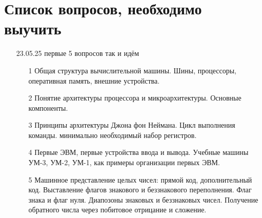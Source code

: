 \documentclass[a4paper,10pt]{article}
\begin{document}
\section*{Список вопросов, необходимо выучить}
\begin{enumerate}
    \item[23.05.25] первые 5 вопросов так и идём
    \begin{enumerate}
        \item[1] 
        Общая структура вычислительной машины. Шины, процессоры, оперативная память, внешние устройства.
        \item[2]
        Понятие архитектуры процессора и микроархитектуры. Основные компоненты.
        \item[3]
        Принципы архитектуры Джона фон Неймана. Цикл выполнения команды. минимально необходимый набор регистров.
        \item[4]
        Первые ЭВМ, первые устройства ввода и вывода. Учебные машины УМ-3, УМ-2, УМ-1, как примеры организации первых ЭВМ.
        \item[5]
        Машинное представление целых чисел: прямой код, дополнительный код. Выставление флагов знакового и беззнакового переполнения.
        Флаг знака и флаг нуля. Диапозоны знаковых и беззнаковых чисел. Получение обратного числа через побитовое отрицание и сложение.
    \end{enumerate} 
\end{enumerate}
\newpage
\end{document}
